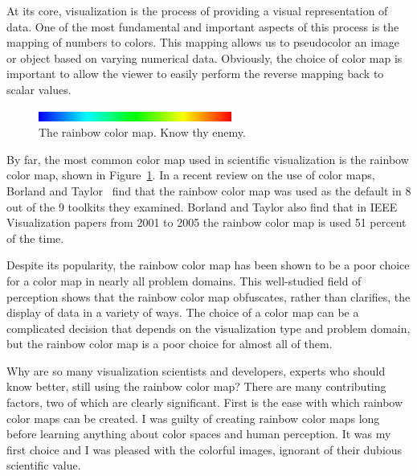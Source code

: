 \documentclass{acmsiggraph}               %
\newcommand{\scite}[1]{~\shortcite{#1}}
\begin{document}

\copyrightspace

At its core, visualization is the process of providing a visual
representation of data.  One of the most fundamental and important aspects
of this process is the mapping of numbers to colors.  This mapping allows
us to pseudocolor an image or object based on varying numerical data.
Obviously, the choice of color map is important to allow the viewer to
easily perform the reverse mapping back to scalar values.

\begin{figure}
  \centering
  \includegraphics[width=2.5in]{images/RainbowBar}
  \caption{The rainbow color map.  Know thy enemy.}
  \label{fig:RainbowColorMap}
\end{figure}

By far, the most common color map used in scientific visualization is the
rainbow color map, shown in Figure~\ref{fig:RainbowColorMap}.  In a recent
review on the use of color maps, Borland and Taylor\scite{Borland07} find
that the rainbow color map was used as the default in 8 out of the 9
toolkits they examined.  Borland and Taylor also find that in IEEE
Visualization papers from 2001 to 2005 the rainbow color map is used 51
percent of the time.

Despite its popularity, the rainbow color map has been shown to be a
poor choice for a color map in nearly all problem domains.  This
well-studied field of perception shows that the rainbow color map obfuscates,
rather than clarifies, the display of data in a variety of ways.  The
choice of a color map can be a complicated decision that depends on
the visualization type and problem domain, but the rainbow color map is a
poor choice for almost all of them.

Why are so many visualization scientists and developers, experts who
should know better, still using the rainbow color map?
There are many contributing factors, two of which are clearly significant.
First is the ease with which rainbow color maps
can be created.  I was guilty of creating rainbow color maps
long before learning anything about color spaces and human perception.  It
was my first choice and I was pleased with the colorful images, ignorant of
their dubious scientific value.
\end{document}
